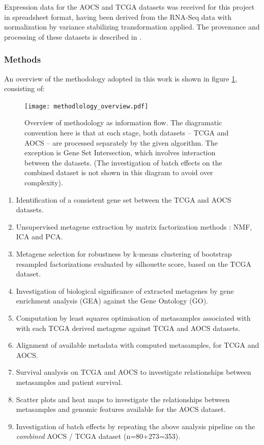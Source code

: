 \documentclass[tikz, 12pt,a4paper,oneside,fleqn]{article}
\begin{document}
Expression data for the AOCS and TCGA datasets was received for this project in spreadsheet format, having been derived from the RNA-Seq data with normalization by variance stabilizing transformation applied.  The provenance and processing of these datasets is described in \cite{Ewing2020}.


\subsubsection{Methods}
An overview of the methodology adopted in this work is shown in figure \ref{fig-method-overview}, consisting of:

\begin{figure}[htb!]
\begin{center}
\texttt{[image: methodlology\_overview.pdf]}
\end{center}
\caption{Overview of methodology as information flow.  The diagramatic convention here is that at each stage, both datasets -- TCGA and AOCS -- are processed separately by the given algorithm.  The exception is Gene Set Intersection, which involves interaction between the datasets.  (The investigation of batch effects on the combined dataset is not shown in this diagram to avoid over complexity). }
\label{fig-method-overview}
\end{figure}

\begin{enumerate}
\item
Identification of a consistent gene set between the TCGA and AOCS datasets.
\item
Unsupervised metagene extraction by matrix factorization methods : NMF, ICA and PCA.
\item
Metagene selection for robustness by k-means clustering of bootstrap resampled factorizations evaluated by silhouette score, based on the TCGA dataset.
\item
Investigation of biological significance of extracted metagenes by gene enrichment analysis (GEA) against the Gene Ontology (GO).
\item
Computation by least squares optimisation of metasamples associated with with each TCGA derived metagene against TCGA and AOCS datasets.
\item
Alignment of available metadata with computed metasamples, for TCGA and AOCS.
\item 
Survival analysis on TCGA and AOCS to investigate relationships between metasamples and patient survival.
\item
Scatter plots and heat maps to investigate the relationships between metasamples and genomic features available for the AOCS dataset.
\item
Investigation of batch effects by repeating the above analysis pipeline on the \emph{combined} AOCS / TCGA dataset (n=80+273=353).

\end{enumerate}
\end{document}
